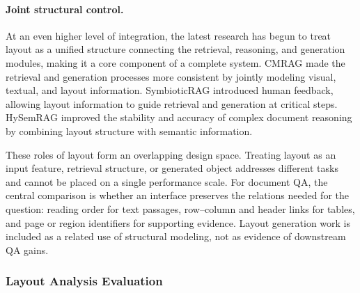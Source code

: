 \paragraph{Joint structural control.}
At an even higher level of integration, the latest research has begun to treat layout as a unified structure connecting the retrieval, reasoning, and generation modules, making it a core component of a complete system. CMRAG \cite{cmrag2025} made the retrieval and generation processes more consistent by jointly modeling visual, textual, and layout information. SymbioticRAG \cite{symbioticrag2025} introduced human feedback, allowing layout information to guide retrieval and generation at critical steps. HySemRAG \cite{hysemrag2025} improved the stability and accuracy of complex document reasoning by combining layout structure with semantic information.

These roles of layout form an overlapping design space. Treating layout as an input feature, retrieval structure, or generated object addresses different tasks and cannot be placed on a single performance scale. For document QA, the central comparison is whether an interface preserves the relations needed for the question: reading order for text passages, row--column and header links for tables, and page or region identifiers for supporting evidence. Layout generation work is included as a related use of structural modeling, not as evidence of downstream QA gains.

\subsubsection{Layout Analysis Evaluation}

